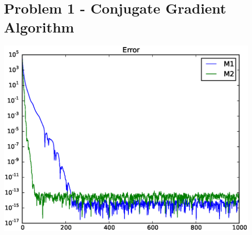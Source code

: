 \documentclass[a4paper]{article}
\begin{document}
\renewcommand{\theFancyVerbLine}{
  \sffamily\textcolor[rgb]{0.5,0.5,0.5}{\scriptsize\arabic{FancyVerbLine}}}

\section{Problem 1 - Conjugate Gradient Algorithm}

  \includegraphics[scale=0.5]{error.eps}


\inputminted{python}{hw5_cg.py}
\end{document}
